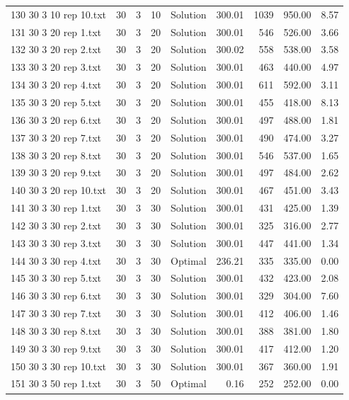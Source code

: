 \begin{longtable}{lrrllrrrr}
130 30 3 10 rep 10.txt & 30 & 3 & 10 & Solution & 300.01 & 1039 & 950.00 &  8.57\\
131 30 3 20 rep 1.txt & 30 & 3 & 20 & Solution & 300.01 & 546 & 526.00 &  3.66\\
132 30 3 20 rep 2.txt & 30 & 3 & 20 & Solution & 300.02 & 558 & 538.00 &  3.58\\
133 30 3 20 rep 3.txt & 30 & 3 & 20 & Solution & 300.01 & 463 & 440.00 &  4.97\\
134 30 3 20 rep 4.txt & 30 & 3 & 20 & Solution & 300.01 & 611 & 592.00 &  3.11\\
135 30 3 20 rep 5.txt & 30 & 3 & 20 & Solution & 300.01 & 455 & 418.00 &  8.13\\
136 30 3 20 rep 6.txt & 30 & 3 & 20 & Solution & 300.01 & 497 & 488.00 &  1.81\\
137 30 3 20 rep 7.txt & 30 & 3 & 20 & Solution & 300.01 & 490 & 474.00 &  3.27\\
138 30 3 20 rep 8.txt & 30 & 3 & 20 & Solution & 300.01 & 546 & 537.00 &  1.65\\
139 30 3 20 rep 9.txt & 30 & 3 & 20 & Solution & 300.01 & 497 & 484.00 &  2.62\\
140 30 3 20 rep 10.txt & 30 & 3 & 20 & Solution & 300.01 & 467 & 451.00 &  3.43\\
141 30 3 30 rep 1.txt & 30 & 3 & 30 & Solution & 300.01 & 431 & 425.00 &  1.39\\
142 30 3 30 rep 2.txt & 30 & 3 & 30 & Solution & 300.01 & 325 & 316.00 &  2.77\\
143 30 3 30 rep 3.txt & 30 & 3 & 30 & Solution & 300.01 & 447 & 441.00 &  1.34\\
144 30 3 30 rep 4.txt & 30 & 3 & 30 & Optimal & 236.21 & 335 & 335.00 &  0.00\\
145 30 3 30 rep 5.txt & 30 & 3 & 30 & Solution & 300.01 & 432 & 423.00 &  2.08\\
146 30 3 30 rep 6.txt & 30 & 3 & 30 & Solution & 300.01 & 329 & 304.00 &  7.60\\
147 30 3 30 rep 7.txt & 30 & 3 & 30 & Solution & 300.01 & 412 & 406.00 &  1.46\\
148 30 3 30 rep 8.txt & 30 & 3 & 30 & Solution & 300.01 & 388 & 381.00 &  1.80\\
149 30 3 30 rep 9.txt & 30 & 3 & 30 & Solution & 300.01 & 417 & 412.00 &  1.20\\
150 30 3 30 rep 10.txt & 30 & 3 & 30 & Solution & 300.01 & 367 & 360.00 &  1.91\\
151 30 3 50 rep 1.txt & 30 & 3 & 50 & Optimal &  0.16 & 252 & 252.00 &  0.00\\

\end{longtable}
